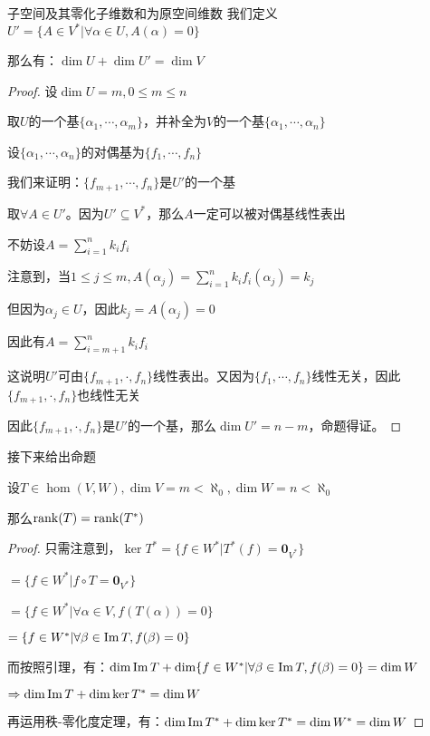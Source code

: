 \documentclass[12pt, a4paper, oneside, UTF8]{ctexbook}
\begin{document}
\begin{para}{0}
\begin{lemma}{子空间及其零化子维数和为原空间维数}{}
							我们定义$U'=\{A \in V^*| \forall \alpha \in U,A(\alpha )=0\}$

							那么有：$\dim U+\dim U'=\dim V$
						\end{lemma}
						\begin{proof}
							设$\dim U = m,0 \leqslant m\leqslant n$

							取$U$的一个基$\{\alpha_1,\cdots,\alpha_m\}$，并补全为$V$的一个基$\{\alpha_1,\cdots,\alpha_n\}$

							设$\{\alpha_1,\cdots,\alpha_n\}$的对偶基为$\{f_1,\cdots,f_n\}$

							我们来证明：$\{f_{m+1},\cdots,f_n\}$是$U'$的一个基

							取$\forall A \in U'$。因为$U' \subseteq V^*$，那么$A$一定可以被对偶基线性表出

							不妨设$A = \sum\limits_{i=1}^{n} k_i f_i$

							注意到，当$1 \leqslant j \leqslant m,A(\alpha_j)=\sum\limits_{i=1}^{n} k_i f_i(\alpha_j)=k_j$

							但因为$\alpha_j \in U$，因此$k_j = A(\alpha_j)=0$

							因此有$A = \sum\limits_{i=m+1}^{n} k_i f_i$

							这说明$U'$可由$\{f_{m+1},\cdot,f_n\}$线性表出。又因为$\{f_1,\cdots,f_n\}$线性无关，因此$\{f_{m+1},\cdot,f_n\}$也线性无关

							因此$\{f_{m+1},\cdot,f_n\}$是$U'$的一个基，那么$\dim U'=n-m$，命题得证。
						\end{proof}
						接下来给出命题
						\begin{proposition}
							设$T \in \hom(V,W),\dim V=m < \aleph_0,\dim W = n< \aleph_0$

							那么$\operatorname{rank}(T)=\operatorname{rank}(T^*)$
						\end{proposition}
						\begin{proof}
							只需注意到，$\ker T^* = \{f \in W^*| T^*(f) = \mathbf{0}_{V^*}\}$

							$=\{f \in W^*| f \circ T = \mathbf{0}_{V^*}\}$

							$=\{f \in W^*| \forall \alpha \in V,f(T(\alpha )) = 0\}$

							$=\{f \in W^*| \forall \beta  \in \operatorname{Im} T,f(\beta ) = 0\}$

							而按照引理，有：$\dim \operatorname{Im} T + \dim \{f \in W^*| \forall \beta  \in \operatorname{Im} T,f(\beta ) = 0\} = \dim W$

							$\Rightarrow \dim \operatorname{Im} T +\dim \ker T^* = \dim W$

							再运用秩-零化度定理，有：$\dim \operatorname{Im} T^* + \dim \ker T^* = \dim W^* =\dim W$


\end{proof}
\end{para}
\end{document}
